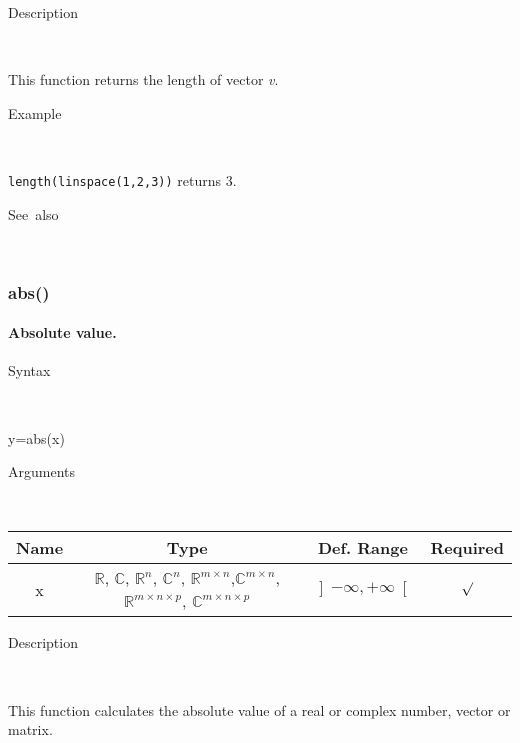 \begin{description}
\item [Description]~
\end{description}
This function returns the length of vector \textit{v}.

\begin{description}
\item [Example]~
\end{description}
\texttt{length(linspace(1,2,3))} returns 3. 
\begin{description}
\item [See~also]~
\end{description}


\newpage
{}




\subsubsection*{\hypertarget{abs}{}{\Large abs()}}


\paragraph{\label{par:Absolute-value}Absolute value.}

\begin{description}
\item [Syntax]~
\end{description}
y=abs(x)

\begin{description}
\item [Arguments]~
\end{description}
\begin{tabular}{|c|c|c|c|}
\hline 
Name&
Type&
Def. Range&
Required\tabularnewline
\hline
\hline 
x&
$\mathbb{R}$, $\mathbb{C}$, $\mathbb{R}^{n}$, $\mathbb{C}^{n}$,
$\mathbb{\mathbb{R}}^{m\times n}$,$\mathbb{\mathbb{C}}^{m\times n}$,
$\mathbb{\mathbb{R}}^{m\times n\times p}$, $\mathbb{\mathbb{C}}^{m\times n\times p}$ &
$\left]-\infty,+\infty\right[$&
$\surd$\tabularnewline
\hline
\end{tabular}

\begin{description}
\item [Description]~
\end{description}
This function calculates the absolute value of a real or complex number,
vector or matrix.

